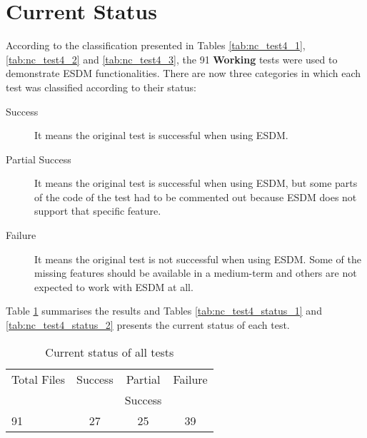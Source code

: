\section{Current Status}

According to the classification presented in Tables \ref{tab:nc_test4_1}, \ref{tab:nc_test4_2} and \ref{tab:nc_test4_3}, the 91 {\bf Working} tests were used to demonstrate ESDM functionalities. There are now three categories in which each test was classified according to their status:

\begin{description}

\item[Success] It means the original test is successful when using ESDM.

\item[Partial Success] It means the original test is successful when using ESDM, but some parts of the code of the test had to be commented out because ESDM does not support that specific feature.


\item[Failure] It means the original test is not successful when using ESDM. Some of the missing features should be available in a medium-term and others are not expected to work with ESDM at all.


\end{description}

Table \ref{tab:nc_test4_status_3} summarises the results and Tables \ref{tab:nc_test4_status_1} and \ref{tab:nc_test4_status_2} presents the current status of each test.

\begin{table}[H]
\centering
\begin{tabular}{|l|c|c|c|}
\hline
\multicolumn{1}{|c|}{Total Files} & \multicolumn{1}{c|}{Success} & \multicolumn{1}{c|}{Partial} & \multicolumn{1}{c|}{Failure} \\
                                  &                              & \multicolumn{1}{c|}{Success} &               \\ \hline \hline
91                                &     27                       &       25                     &       39      \\ \hline \hline
\end{tabular}
\caption{\label{tab:nc_test4_status_3} Current status of all tests}
\end{table}

